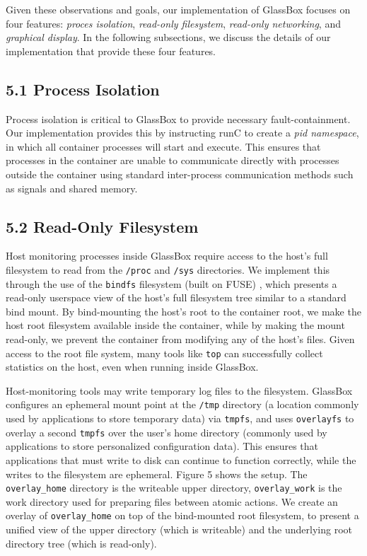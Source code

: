 \documentclass{proc}
\begin{document}
Given these observations and goals, our implementation of GlassBox focuses on four features: \textit{proces isolation}, \textit{read-only filesystem}, \textit{read-only networking}, and \textit{graphical display}. In the following subsections, we discuss the details of our implementation that provide these four features.

\subsection*{5.1 Process Isolation}

Process isolation is critical to GlassBox to provide necessary fault-containment. Our implementation provides this by instructing runC to create a \textit{pid namespace}, in which all container processes will start and execute. This ensures that processes in the container are unable to communicate directly with processes outside the container using standard inter-process communication methods such as signals and shared memory.

\subsection*{5.2 Read-Only Filesystem}

Host monitoring processes inside GlassBox require access to the host's full filesystem to read from the \texttt{/proc} and \texttt{/sys} directories. We implement this through the use of the \texttt{bindfs} filesystem (built on FUSE) \cite{bindfs}, which presents a read-only userspace view of the host's full filesystem tree similar to a standard bind mount. By bind-mounting the host's root to the container root, we make the host root filesystem available inside the container, while by making the mount read-only, we prevent the container from modifying any of the host's files. Given access to the root file system, many tools like \texttt{top} can successfully collect statistics on the host, even when running inside GlassBox.

Host-monitoring tools may write temporary log files to the filesystem. GlassBox configures an ephemeral mount point at the \texttt{/tmp} directory (a location commonly used by applications to store temporary data) via \texttt{tmpfs}, and uses \texttt{overlayfs} to overlay a second \texttt{tmpfs} over the user's home directory (commonly used by applications to store personalized configuration data). This ensures that applications that must write to disk can continue to function correctly, while the writes to the filesystem are ephemeral. Figure 5 shows the setup. The \texttt{overlay\_home} directory is the writeable upper directory, \texttt{overlay\_work} is the work directory used for preparing files between atomic actions. We create an overlay of \texttt{overlay\_home} on top of the bind-mounted root filesystem, to present a unified view of the upper directory (which is writeable) and the underlying root directory tree (which is read-only).
\end{document}
